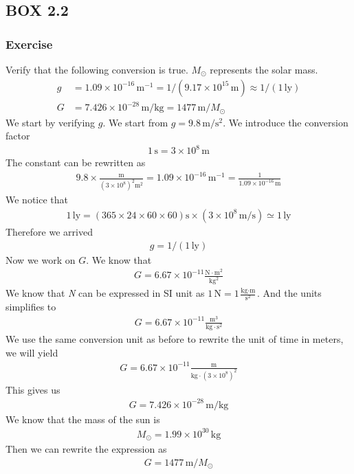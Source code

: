 \documentclass[12pt]{book}
\newcommand{\paren}[1]{\left( #1 \right)}
\begin{document}
\subsection{BOX 2.2}
\subsubsection{Exercise}
Verify that the following conversion is true. $M_\odot$ represents the solar mass.
\begin{align*}
g &= 1.09 \times 10^{-16} \, \text{m}^{-1} = 1 / (9.17 \times 10^{15} \, \text{m}) \approx 1 / (1 \, \text{ly})\\
G &= 7.426 \times 10^{-28} \, \text{m/kg} = 1477 \, \text{m} / M_\odot
\end{align*}
We start by verifying $g$. We start from $g = 9.8 \,\text{m/s$^2$}$. We introduce the conversion factor
\begin{align}
1\, \text{s} = 3\times 10^{8} \,\text{m}
\end{align}
The constant can be rewritten as
\begin{align}
9.8 \times \frac{\text{m}}{\paren{3\times 10^{8}}^2\text{m}^2} =  1.09 \times 10^{-16} \, \text{m}^{-1} = \frac{1}{1.09 \times 10^{-16}\,\text{m}}
\end{align}
We notice that
\begin{align}
1\,\text{ly} = \paren{365\times 24\times 60\times 60}\text{s} \times \paren{3\times 10^{8} \,\text{m/s}} \simeq 1\,\text{ly}
\end{align}
Therefore we arrived 
\begin{align}
g = 1 / (1 \, \text{ly})
\end{align}
Now we work on $G$. We know that 
\begin{align}
G = 6.67 \times 10^{-11} \frac{\text{N}\cdot\text{m}^2}{\text{kg}^2}
\end{align}
We know that \textit{N} can be expressed in SI unit as $1\,$N$= 1\frac{\text{kg}\cdot\text{m}}{\text{s}^2}$. And the units simplifies to
\begin{align}
G = 6.67 \times 10^{-11} \frac{\text{m}^3}{\text{kg}\cdot \text{s}^2}
\end{align}
We use the same conversion unit as before to rewrite the unit of time in meters, we will yield
\begin{align}
G = 6.67 \times 10^{-11} \frac{\text{m}}{\text{kg}\cdot \paren{3\times 10^{8}}^2}
\end{align}
This gives us
\begin{align}
G = 7.426 \times 10^{-28}\, \text{m/kg}
\end{align}
We know that the mass of the sun is
\begin{align}
M_\odot = 1.99 \times 10^{30}\,\text{kg}
\end{align}
Then we can rewrite the expression as
\begin{align}
G = 1477 \, \text{m} / M_\odot
\end{align}
\end{document}
